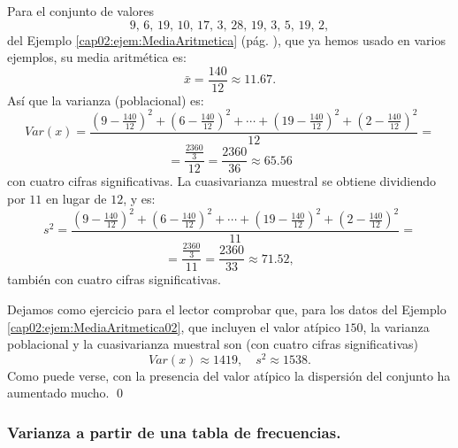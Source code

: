 \begin{ejemplo}
\label{cap02:ejem:Varianza}
Para el conjunto de valores
\[9,\, 6,\, 19,\, 10,\, 17,\, 3,\, 28,\, 19,\, 3,\, 5,\, 19,\, 2,\]
del Ejemplo \ref{cap02:ejem:MediaAritmetica} (pág. \pageref{cap02:ejem:MediaAritmetica}), que ya hemos usado en varios ejemplos, su media aritmética es:
\[\bar x=\dfrac{140}{12}\approx 11.67.\]
Así que la varianza (poblacional) es:
\[Var(x)=\dfrac{\left(9-\frac{140}{12}\right)^2+\left(6-\frac{140}{12}\right)^2+\cdots+\left(19-\frac{140}{12}\right)^2+\left(2-\frac{140}{12}\right)^2}{12}=\]
\[=\dfrac{\frac{2360}{3}}{12}=\dfrac{2360}{36}\approx 65.56\]
con cuatro cifras significativas. La cuasivarianza muestral se obtiene dividiendo por $11$ en lugar de $12$, y es:
\[s^2=\dfrac{\left(9-\frac{140}{12}\right)^2+\left(6-\frac{140}{12}\right)^2+\cdots+\left(19-\frac{140}{12}\right)^2+\left(2-\frac{140}{12}\right)^2}{11}=\]
\[=\dfrac{\frac{2360}{3}}{11}=\dfrac{2360}{33}\approx 71.52,\]
también con cuatro cifras significativas.

Dejamos como ejercicio para el lector comprobar que, para los datos del Ejemplo \ref{cap02:ejem:MediaAritmetica02}, que incluyen el valor atípico $150$, la varianza poblacional y la cuasivarianza muestral son (con cuatro cifras significativas)
\[
Var(x)\approx 1419,\quad s^2\approx 1538.
\]
Como puede verse, con la presencia del valor atípico la dispersión del conjunto ha aumentado mucho.
\qed
\end{ejemplo}

\subsubsection*{Varianza a partir de una tabla de frecuencias.}

